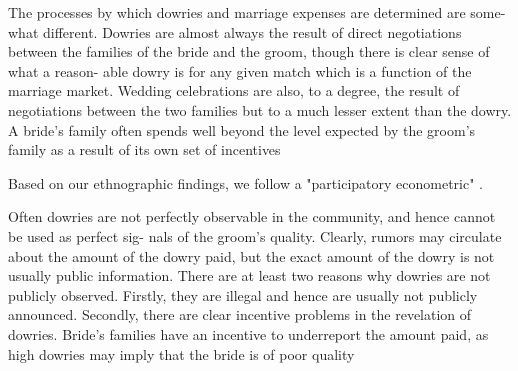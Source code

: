 \documentclass[a4paper, 11pt, onecolumn]{article}
\begin{document}
The processes by which dowries and marriage expenses are determined are some-
what different. Dowries are almost always the result of direct negotiations between
the families of the bride and the groom, though there is clear sense of what a reason-
able dowry is for any given match which is a function of the marriage market.
Wedding celebrations are also, to a degree, the result of negotiations between the
two families but to a much lesser extent than the dowry. A bride's family often spends
well beyond the level expected by the groom's family as a result of its own set of
incentives

Based on our ethnographic findings, we follow a "participatory econometric" \cite{Rao1997, Rao2002}.

Often dowries are not perfectly observable in the community, and hence cannot be used as perfect sig-
nals of the groom's quality. Clearly, rumors may circulate about the amount of the dowry paid, but the exact
amount of the dowry is not usually public information. There are at least two reasons why dowries are not
publicly observed. Firstly, they are illegal and hence are usually not publicly announced. Secondly, there are
clear incentive problems in the revelation of dowries. Bride's families have an incentive to underreport
the
amount paid, as high dowries may imply that the bride is of poor quality
\end{document}
